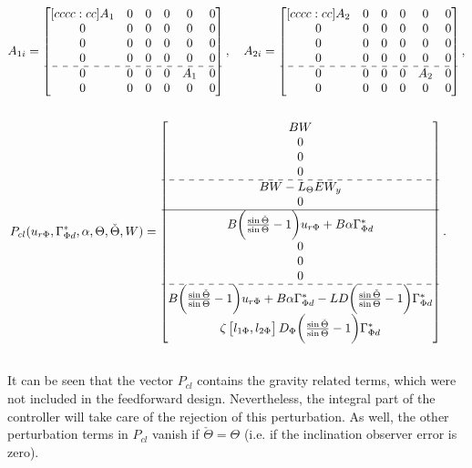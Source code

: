 \documentclass[../main.tex]{subfiles}
\begin{document}
\begin{align*}
		A_{1i} &= 
		\begin{bmatrix}[cccc:cc]
		A_1 & 0 & 0 & 0 & 0 & 0\\
		0 & 0 & 0 & 0 & 0 & 0\\
		0 & 0 & 0 & 0 & 0 & 0\\
		0 & 0 & 0 & 0 & 0 & 0\\ \hdashline
		0 & 0 & 0 & 0 & A_1 & 0\\ 
		0 & 0 & 0 & 0 & 0 & 0
		\end{bmatrix}, \quad
		A_{2i} = 
		\begin{bmatrix}[cccc:cc]
		A_2 & 0 & 0 & 0 & 0 & 0\\
		0 & 0 & 0 & 0 & 0 & 0\\
		0 & 0 & 0 & 0 & 0 & 0\\
		0 & 0 & 0 & 0 & 0 & 0\\ \hdashline
		0 & 0 & 0 & 0 & A_2 & 0\\ 
		0 & 0 & 0 & 0 & 0 & 0
		\end{bmatrix}, \nonumber \\
	\nonumber \\
		P_{cl}&(u_{r\Phi},\Gamma_{\Phi d}^*,\alpha, \Theta,\check{\Theta},W) = \begin{bmatrix}
		BW \\
		0 \\
		0 \\
		0 \\ \hdashline
		BW - L_\Theta E W_y\\
		0 \\ \hline
		B \bigg(\frac{\sin \check{\Theta}}{\sin \Theta} - 1\bigg) u_{r\Phi} + B\alpha\Gamma_{\Phi d}^*\\
		0 \\
		0 \\
		0 \\ \hdashline
		B \bigg(\frac{\sin \check{\Theta}}{\sin \Theta} - 1\bigg) u_{r\Phi} + B\alpha\Gamma_{\Phi d}^* - LD\bigg( \frac{\sin \check{\Theta}}{\sin \Theta}-1\bigg)\Gamma_{\Phi d}^*\\
		\zeta \begin{bmatrix}l_{1\Phi} , l_{2\Phi}\end{bmatrix} D_\Phi\bigg( \frac{\sin \check{\Theta}}{\sin \Theta} - 1\bigg)\Gamma_{\Phi d}^* \\		
		\end{bmatrix}.
		\\\nonumber
	\end{align*}
	It can be seen that the vector $P_{cl}$ contains the gravity related terms, which were not included in the feedforward design. Nevertheless, the integral part of the controller will take care of the rejection of this perturbation. As well, the other perturbation terms in $P_{cl}$ vanish if $\check{\Theta} = \Theta$ (i.e. if the inclination observer error is zero).
	\newpage
\end{document}
